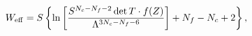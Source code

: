 \begin{equation}
\label{Eq:W_eff_summary}
W_{\rm eff}=S 
\left\{ 
\ln\left[
\frac{
	S^{N_c-N_f-2}\det T\cdot f(Z)
}
{
	\Lambda^{3N_c-N_f-6}
} 
\right] 
+N_f-N_c+2\right\},
\end{equation}

